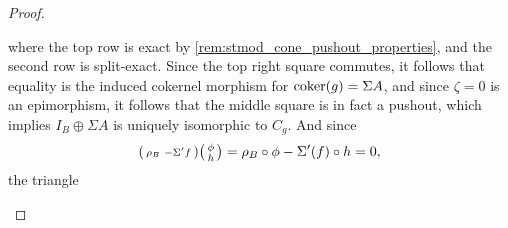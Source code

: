 \begin{proof}
\begin{enumerate}[label={(\bfseries TR\arabic*)}]
{\begin{center}
            \end{center}
            where the top row is exact by \autoref{rem:stmod_cone_pushout_properties}, and the second row is split-exact. Since the top right square commutes, it follows that equality is the induced cokernel morphism for \( \operatorname{coker}(g) = \Sigma A \), and since \( \zeta = 0 \) is an epimorphism, it follows that the middle square is in fact a pushout, which implies \( I_B \oplus \Sigma A  \) is uniquely isomorphic to \( C_g \). %
            And since
            \[
                \begin{psmallmatrix}
                    \rho_B & -\Sigma' f
                \end{psmallmatrix}
                \begin{psmallmatrix}
                    \phi \\
                    h
                \end{psmallmatrix}
                =
                \rho_B \circ \phi - \Sigma'(f) \circ h = 0,
            \]
            the triangle
            \begin{center}
\end{center}}
\end{enumerate}
\end{proof}
